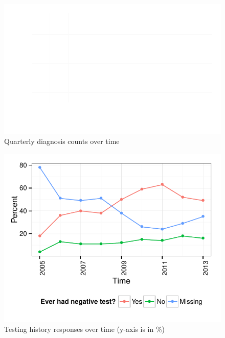 \documentclass{article}\usepackage[]{graphicx}\usepackage[]{color}
\makeatletter
\def\maxwidth{ %
  \ifdim\Gin@nat@width>\linewidth
    \linewidth
  \else
    \Gin@nat@width
  \fi
}
\newenvironment{knitrout}{}{} %
\makeatother
\begin{document}
\begin{knitrout}\footnotesize
{}\color{fgcolor}\begin{figure}[!h]


{\centering \includegraphics[width=\maxwidth]{figure/minimal-plot_diagnoses} 

}

\caption[Quarterly diagnosis counts over time]{Quarterly diagnosis counts over time\label{fig:plot_diagnoses}}
\end{figure}


\end{knitrout}



\begin{knitrout}\footnotesize
{}\color{fgcolor}\begin{figure}[!h]


{\centering \includegraphics[width=\maxwidth]{figure/minimal-plot_time} 

}

\caption[Testing history responses over time (y-axis is in \%)]{Testing history responses over time (y-axis is in \%)\label{fig:plot_time}}
\end{figure}


\end{knitrout}
\end{document}
